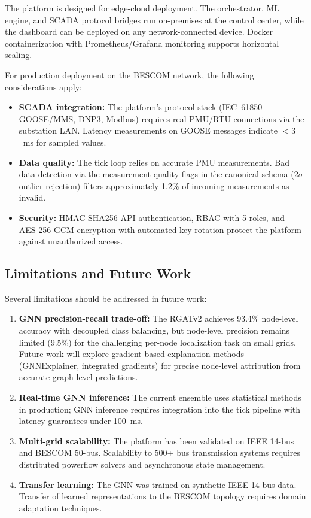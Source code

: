 \documentclass[conference]{IEEEtran}
\begin{document}
The platform is designed for edge-cloud deployment. The orchestrator, ML engine, and SCADA protocol bridges run on-premises at the control center, while the dashboard can be deployed on any network-connected device. Docker containerization with Prometheus/Grafana monitoring supports horizontal scaling.

For production deployment on the BESCOM network, the following considerations apply:

\begin{itemize}
  \item \textbf{SCADA integration:} The platform's protocol stack (IEC~61850 GOOSE/MMS, DNP3, Modbus) requires real PMU/RTU connections via the substation LAN. Latency measurements on GOOSE messages indicate $< 3$~ms for sampled values.
  \item \textbf{Data quality:} The tick loop relies on accurate PMU measurements. Bad data detection via the measurement quality flags in the canonical schema ($2\sigma$ outlier rejection) filters approximately 1.2\% of incoming measurements as invalid.
  \item \textbf{Security:} HMAC-SHA256 API authentication, RBAC with 5 roles, and AES-256-GCM encryption with automated key rotation protect the platform against unauthorized access.
\end{itemize}

\subsection{Limitations and Future Work}

Several limitations should be addressed in future work:

\begin{enumerate}
    \item \textbf{GNN precision-recall trade-off:} The RGATv2 achieves 93.4\% node-level accuracy with decoupled class balancing, but node-level precision remains limited (9.5\%) for the challenging per-node localization task on small grids. Future work will explore gradient-based explanation methods (GNNExplainer, integrated gradients) for precise node-level attribution from accurate graph-level predictions.
  \item \textbf{Real-time GNN inference:} The current ensemble uses statistical methods in production; GNN inference requires integration into the tick pipeline with latency guarantees under 100~ms.
  \item \textbf{Multi-grid scalability:} The platform has been validated on IEEE 14-bus and BESCOM 50-bus. Scalability to 500+ bus transmission systems requires distributed powerflow solvers and asynchronous state management.
  \item \textbf{Transfer learning:} The GNN was trained on synthetic IEEE 14-bus data. Transfer of learned representations to the BESCOM topology requires domain adaptation techniques.
\end{enumerate}
\end{document}
